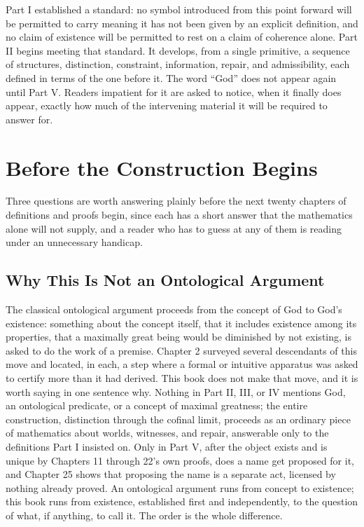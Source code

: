 \documentclass[11pt]{book}
\begin{document}
Part I established a standard: no symbol introduced from this point forward will be permitted to carry meaning it has not been given by an explicit definition, and no claim of existence will be permitted to rest on a claim of coherence alone. Part II begins meeting that standard. It develops, from a single primitive, a sequence of structures, distinction, constraint, information, repair, and admissibility, each defined in terms of the one before it. The word ``God'' does not appear again until Part V. Readers impatient for it are asked to notice, when it finally does appear, exactly how much of the intervening material it will be required to answer for.

\chapter*{Before the Construction Begins}

Three questions are worth answering plainly before the next twenty chapters of definitions and proofs begin, since each has a short answer that the mathematics alone will not supply, and a reader who has to guess at any of them is reading under an unnecessary handicap.

\section*{Why This Is Not an Ontological Argument}

The classical ontological argument proceeds from the concept of God to God's existence: something about the concept itself, that it includes existence among its properties, that a maximally great being would be diminished by not existing, is asked to do the work of a premise. Chapter 2 surveyed several descendants of this move and located, in each, a step where a formal or intuitive apparatus was asked to certify more than it had derived. This book does not make that move, and it is worth saying in one sentence why. Nothing in Part II, III, or IV mentions God, an ontological predicate, or a concept of maximal greatness; the entire construction, distinction through the cofinal limit, proceeds as an ordinary piece of mathematics about worlds, witnesses, and repair, answerable only to the definitions Part I insisted on. Only in Part V, after the object exists and is unique by Chapters 11 through 22's own proofs, does a name get proposed for it, and Chapter 25 shows that proposing the name is a separate act, licensed by nothing already proved. An ontological argument runs from concept to existence; this book runs from existence, established first and independently, to the question of what, if anything, to call it. The order is the whole difference.
\end{document}

